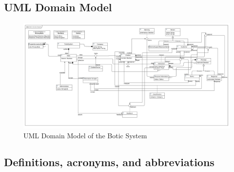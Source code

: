 \documentclass[11pt]{article}
\begin{document}

\subsection{UML Domain Model}

\begin{figure}[H]
	\centering
	\hspace*{-1.7cm}\includegraphics[width=1.2\textwidth]{../../images/Botic_Domain_Diagram.png}
	\caption{UML Domain Model of the Botic System}
\end{figure}

\subsection{Definitions, acronyms, and abbreviations}
\end{document}
